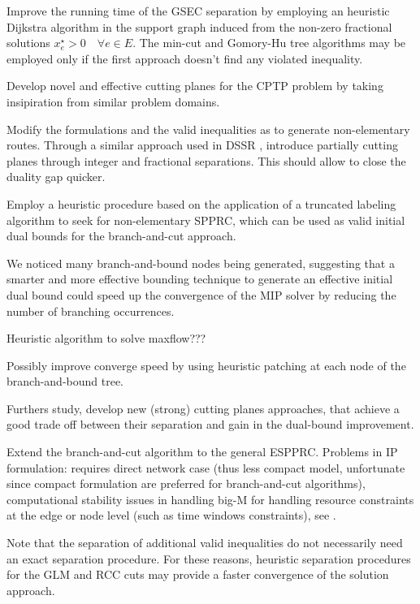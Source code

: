 Improve the running time of the GSEC separation by employing an heuristic
Dijkstra algorithm in the support graph induced from the non-zero fractional solutions $x^\star_e > 0 \quad \forall e \in E$.
The min-cut and Gomory-Hu tree algorithms may be employed only if the first approach
doesn't find any violated inequality.

Develop novel and effective cutting planes for the CPTP problem by taking
insipiration from similar problem domains.

Modify the formulations and the valid inequalities as to generate non-elementary routes.
Through a similar approach used in DSSR \parencite{boland2006, righini2008, martinelli2014},
introduce partially cutting planes through integer and fractional separations.
This should allow to close the duality gap quicker.

Employ a heuristic procedure based on
the application of a truncated labeling algorithm
to seek for non-elementary SPPRC, which can be used as valid initial
dual bounds for the branch-and-cut approach.

\medskip

We noticed many branch-and-bound nodes being generated,
suggesting that a smarter and more effective bounding technique to
generate an effective initial dual bound could speed up the convergence
of the MIP solver by reducing the number of branching occurrences.

Heuristic algorithm to solve maxflow???

Possibly improve converge speed by using heuristic patching at each
node of the branch-and-bound tree.

Furthers study, develop new (strong) cutting planes approaches,
that achieve a good trade off between their separation and gain
in the dual-bound improvement.

Extend the branch-and-cut algorithm
to the general ESPPRC.
Problems in IP formulation:
requires direct network case (thus less compact model, unfortunate since compact formulation are
preferred for branch-and-cut algorithms),
computational stability issues in handling big-M
for handling resource constraints at the edge or node level (such as time windows constraints),
see \textcite{jepsen2008branchandcut}.

Note that the separation of additional valid inequalities do not
necessarily need an exact separation procedure.
For these reasons, heuristic separation procedures for the GLM and RCC
cuts may provide a faster convergence of the solution approach.

